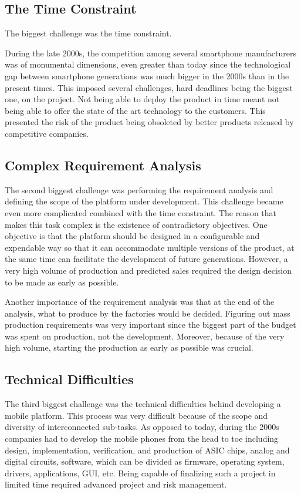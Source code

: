\documentclass[conference]{IEEEtran}
\begin{document}
\subsection{The Time Constraint}
The biggest challenge was the time constraint. 

During the late 2000s, the competition among several smartphone manufacturers was of monumental dimensions, even greater than today since the technological gap between smartphone generations was much bigger in the 2000s than in the present times. This imposed several challenges, hard deadlines being the biggest one, on the project. Not being able to deploy the product in time meant not being able to offer the state of the art technology to the customers. This presented the risk of the product being obsoleted by better products released by competitive companies.

\subsection{Complex Requirement Analysis}
The second biggest challenge was performing the requirement analysis and defining the scope of the platform under development. This challenge became even more complicated combined with the time constraint. The reason that makes this task complex is the existence of contradictory objectives. One objective is that the platform should be designed in a configurable and expendable way so that it can accommodate multiple versions of the product, at the same time can facilitate the development of future generations. However, a very high volume of production and predicted sales required the design decision to be made as early as possible.

Another importance of the requirement analysis was that at the end of the analysis, what to produce by the factories would be decided. Figuring out mass production requirements was very important since the biggest part of the budget was spent on production, not the development. Moreover, because of the very high volume, starting the production as early as possible was crucial. 

\subsection{Technical Difficulties}
The third biggest challenge was the technical difficulties behind developing a mobile platform. This process was very difficult because of the scope and diversity of interconnected sub-tasks. As opposed to today, during the 2000s companies had to develop the mobile phones from the head to toe including design, implementation, verification, and production of ASIC chips, analog and digital circuits, software, which can be divided as firmware, operating system, drivers, applications, GUI, etc. Being capable of finalizing such a project in limited time required advanced project and risk management. 
\end{document}
